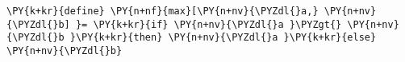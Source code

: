 \begin{Verbatim}[commandchars=\\\{\}]
\PY{k+kr}{define} \PY{n+nf}{max}[\PY{n+nv}{\PYZdl{}a,} \PY{n+nv}{\PYZdl{}b] }= \PY{k+kr}{if} \PY{n+nv}{\PYZdl{}a }\PYZgt{} \PY{n+nv}{\PYZdl{}b }\PY{k+kr}{then} \PY{n+nv}{\PYZdl{}a }\PY{k+kr}{else} \PY{n+nv}{\PYZdl{}b}
\end{Verbatim}
